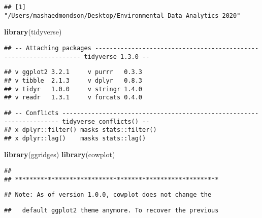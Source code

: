 \documentclass[]{article}
\newenvironment{Shaded}{\begin{snugshade}}{\end{snugshade}}
\newcommand{\CommentTok}[1]{\textcolor[rgb]{0.56,0.35,0.01}{\textit{#1}}}
\newcommand{\KeywordTok}[1]{\textcolor[rgb]{0.13,0.29,0.53}{\textbf{#1}}}
\newcommand{\NormalTok}[1]{#1}
\begin{document}
\begin{Shaded}
\end{Shaded}

\begin{verbatim}
## [1] "/Users/mashaedmondson/Desktop/Environmental_Data_Analytics_2020"
\end{verbatim}

\begin{Shaded}
\begin{Highlighting}[]
\KeywordTok{library}\NormalTok{(tidyverse)}
\end{Highlighting}
\end{Shaded}

\begin{verbatim}
## -- Attaching packages ------------------------------------------------------------------ tidyverse 1.3.0 --
\end{verbatim}

\begin{verbatim}
## v ggplot2 3.2.1     v purrr   0.3.3
## v tibble  2.1.3     v dplyr   0.8.3
## v tidyr   1.0.0     v stringr 1.4.0
## v readr   1.3.1     v forcats 0.4.0
\end{verbatim}

\begin{verbatim}
## -- Conflicts --------------------------------------------------------------------- tidyverse_conflicts() --
## x dplyr::filter() masks stats::filter()
## x dplyr::lag()    masks stats::lag()
\end{verbatim}

\begin{Shaded}
\begin{Highlighting}[]
\KeywordTok{library}\NormalTok{(ggridges)}
\KeywordTok{library}\NormalTok{(cowplot)}
\end{Highlighting}
\end{Shaded}

\begin{verbatim}
## 
## ********************************************************
\end{verbatim}

\begin{verbatim}
## Note: As of version 1.0.0, cowplot does not change the
\end{verbatim}

\begin{verbatim}
##   default ggplot2 theme anymore. To recover the previous
\end{verbatim}
\end{document}
